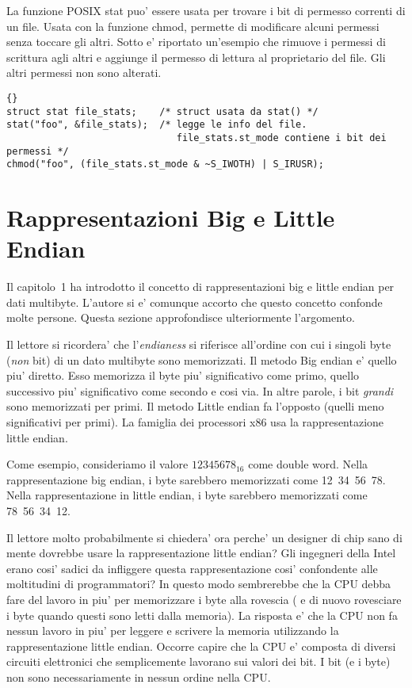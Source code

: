 La funzione POSIX {\code stat} puo' essere usata per trovare i bit
di permesso correnti di un file. Usata con la funzione {\code chmod},
permette di modificare alcuni permessi senza toccare gli altri.
Sotto e' riportato un'esempio che rimuove i permessi di scrittura
agli altri e aggiunge il permesso di lettura al proprietario del file.
Gli altri permessi non sono alterati.
\begin{lstlisting}{}
struct stat file_stats;    /* struct usata da stat() */
stat("foo", &file_stats);  /* legge le info del file. 
                              file_stats.st_mode contiene i bit dei permessi */
chmod("foo", (file_stats.st_mode & ~S_IWOTH) | S_IRUSR);
\end{lstlisting}

\section{Rappresentazioni Big e Little Endian}

Il capitolo~1 ha introdotto il concetto di rappresentazioni big e 
little endian per dati multibyte. L'autore si e' comunque accorto
che questo concetto confonde molte persone. Questa sezione 
approfondisce ulteriormente l'argomento.

Il lettore si ricordera' che l'\emph{endianess} si riferisce all'ordine
con cui i singoli byte (\emph{non} bit) di un dato multibyte sono
memorizzati. Il metodo Big endian e' quello piu' diretto. Esso memorizza
il byte piu' significativo come primo, quello successivo piu' significativo
come secondo e cosi via. In altre parole, i bit \emph{grandi} sono
memorizzati per primi. Il metodo Little endian fa l'opposto (quelli
meno significativi per primi). La famiglia dei processori x86 usa
la rappresentazione little endian. 

Come esempio, consideriamo il valore $12345678_{16}$ come double word.
Nella rappresentazione big endian, i byte sarebbero memorizzati come
12~34~56~78. Nella  rappresentazione in little endian, i byte sarebbero
memorizzati come 78~56~34~12.

Il lettore molto probabilmente si chiedera' ora perche' un designer di chip
sano di mente dovrebbe usare la rappresentazione little endian? Gli
ingegneri della Intel erano cosi' sadici da infliggere questa 
rappresentazione cosi' confondente alle moltitudini di programmatori? 
In questo modo sembrerebbe che la CPU debba fare del lavoro in piu' per 
memorizzare i byte alla rovescia ( e di nuovo rovesciare i byte
quando questi sono letti dalla memoria). La risposta e' che la CPU
non fa nessun lavoro in piu' per leggere e scrivere la memoria
utilizzando la rappresentazione little endian. Occorre capire che
la CPU e' composta di diversi circuiti elettronici che semplicemente
lavorano sui valori dei bit. I bit (e i byte) non sono necessariamente
in nessun ordine nella CPU.

